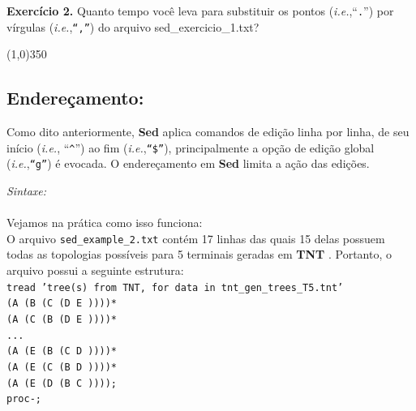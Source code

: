 \begin{refsection}

\begin{blackBlock}{\textbf{Exercício 2.}}\label{tut2:ex:2.\arabic{ex}}
Quanto tempo você leva para substituir os pontos (\textit{i.e.},``\texttt{.}'') por vírgulas (\textit{i.e.},\texttt{``,''}) do arquivo sed\_exercicio\_1.txt?

\begin{center}
\line(1,0){350}\\
\end{center}

\end{blackBlock}

\subsection{Endereçamento:}\label{tut2:sed:address}

	Como dito anteriormente, \textbf{Sed} aplica comandos de edição linha por linha, de seu início (\textit{i.e.}, ``\texttt{\^{}}'') ao fim (\textit{i.e.},\texttt{``\$''}), principalmente a opção de edição global (\textit{i.e.},\texttt{``g''}) é evocada. O endereçamento em \textbf{Sed} limita a ação das edições.\

\textit{Sintaxe:}\\
 \\

Vejamos na prática como isso funciona:\\

O arquivo \texttt{sed\_example\_2.txt} contém 17 linhas das quais 15 delas possuem todas as topologias possíveis para 5 terminais geradas em \textbf{TNT} \parencite{GoloboffEtAl_2008}. Portanto, o arquivo possui a seguinte estrutura:\\

\noindent\texttt{tread 'tree(s) from TNT, for data in tnt\_gen\_trees\_T5.tnt'}\\
\texttt{(A (B (C (D E ))))*}\\
\texttt{(A (C (B (D E ))))*}\\
\texttt{...}\\
\texttt{(A (E (B (C D ))))*}\\
\texttt{(A (E (C (B D ))))*}\\
\texttt{(A (E (D (B C ))));}\\
\texttt{proc-;}\\


\end{refsection}
